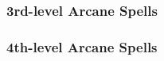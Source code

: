 \subsubsection{3rd-level Arcane Spells} 
\begin{swspelllist}

    \SLdimensionalanchor[Abjur]
    \SLdispelmagic
    \SLprotectionfromenergy
    \SLdeflection*

    \SLdimensionalanchor[Conj]
    \SLsummonmonsteriii
    \SLweb
    \SLdimensionslide*

    \SLlocateobjectgreater[Div]
    \SLreadmind
    \SLunlivingeyes
    \SLmomentofpresciencelesser*

    \SLconfusion[Ench]
    \SLcrushingdespair
    \SLheroism
    \SLhypnoticpattern
    \SLaversion*

    \SLfireball[Evoc]
    \SLlifeseekingmissile
    \SLlightningbolt
    \SLlevitate
    \SLtelekineticmaneuver*

    \SLhypnoticpattern[Illus]
    \SLinvisibility
    \SLminorimage*

    \SLinflictseriouswounds[Necro]
    \SLlifeseekingmissile
    \SLunlivingeyes
    \SLlinkvitality*

    \SLgaseousform[Trans]
    \SLshrinkitem

    \SLprismaticbeam[Univ]
\end{swspelllist}

\subsubsection{4th-level Arcane Spells} 
\begin{swspelllist}

    \SLdismissal[Abjur]
    \SLretributiveshield
    \SLspellresistance*

    \SLblink[Conj]
    \SLdismissal
    \SLicestorm
    \SLsummonmonsteriv
    \SLdimensiondoor*

    \SLdiscernvulnerability[Div]
    \SLlocatecreature
    \SLmomentofprescience
    \SLprecognition*

    \SLholdmonster[Ench]
    \SLphantasmalkiller
    \SLsleep
    \SLsuggestion*

    \SLicestorm[Evoc]
    \SLshout
    \SLwalloffire
    \SLtelekineticforce*

    \SLdisplacement[Illus]
    \SLphantasmalkiller
    \SLmajorimage*

    \SLenervation[Necro]
    \SLinflictcriticalwounds
    \SLretributiveshield
    \SLbestowcurse*

    \SLfly[Trans]
    \SLinvestmagic
    \SLstoneskin
    \SLhaste*
\end{swspelllist}

